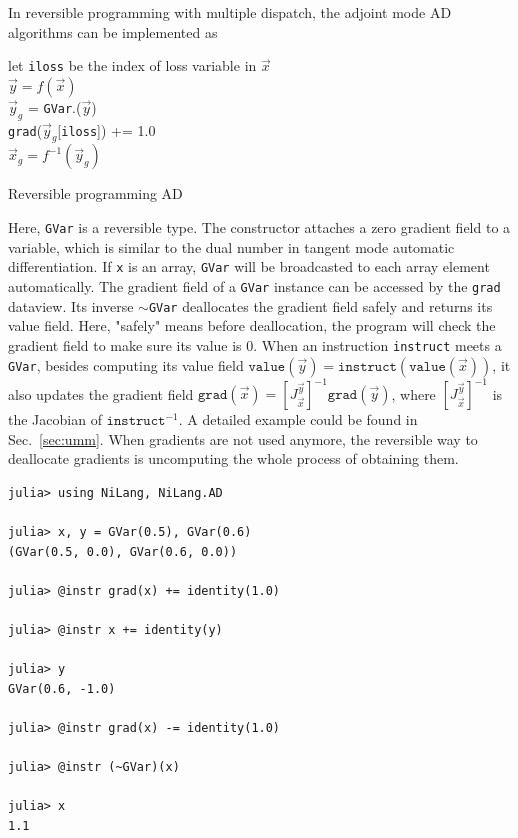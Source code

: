 \documentclass[aps,twocolumn,longbibliography,english,superscriptaddress,prr]{revtex4-1}
\newcommand{\<}{\langle}
\renewcommand{\>}{\rangle}
\newcommand{\vx}{{\vec x}}
\newcommand{\vy}{{\vec y}}
\newcommand{\vvalue}{{\texttt{value}}}
\newcommand{\grad}{{\texttt{grad}}}
\newcommand{\Sec}[1]{Sec.~\ref{#1}}
\theoremstyle{definition}\newtheorem{definition}{\textit{Definition}}
\begin{document}
In reversible programming with multiple dispatch, the adjoint mode AD algorithms can be implemented as

\begin{algorithm}[H]
    \KwResult{\grad.($\vx_g$)}
    let \texttt{iloss} be the index of loss variable in $\vx$\\
    $\vy = f(\vx)$\\
    $\vy_g$ = \texttt{GVar}.($\vy$)\\
    \grad($\vy_g$[\texttt{iloss}]) += 1.0\\
    $\vx_g= f^{-1}(\vy_g)$
    \caption{Reversible programming AD}\label{alg:ad}
\end{algorithm}

Here, \texttt{GVar} is a reversible type. The constructor attaches a zero gradient field to a variable, which is similar to the dual number in tangent mode automatic differentiation. If \texttt{x} is an array, \texttt{GVar} will be broadcasted to each array element automatically. The gradient field of a \texttt{GVar} instance can be accessed by the \texttt{grad} dataview. Its inverse \texttt{$\sim$GVar} deallocates the gradient field safely and returns its value field. Here, "safely" means before deallocation, the program will check the gradient field to make sure its value is $0$.
When an instruction \texttt{instruct} meets a \texttt{GVar}, besides computing its value field $\vvalue(\vy) = \texttt{instruct}(\vvalue(\vx))$, it also updates the gradient field $\grad(\vx) = \left[J^{\vy}_{\vx}\right]^{-1} \grad(\vy)$, where $\left[J^{\vy}_{\vx}\right]^{-1}$ is the Jacobian of $\texttt{instruct}^{-1}$. A detailed example could be found in \Sec{sec:umm}. When gradients are not used anymore, the reversible way to deallocate gradients is uncomputing the whole process of obtaining them.

\begin{minipage}{.44\textwidth}
\begin{lstlisting}
julia> using NiLang, NiLang.AD

julia> x, y = GVar(0.5), GVar(0.6)
(GVar(0.5, 0.0), GVar(0.6, 0.0))

julia> @instr grad(x) += identity(1.0)

julia> @instr x += identity(y)

julia> y
GVar(0.6, -1.0)

julia> @instr grad(x) -= identity(1.0)

julia> @instr (~GVar)(x)

julia> x
1.1
\end{lstlisting}
\end{minipage}
\end{document}
